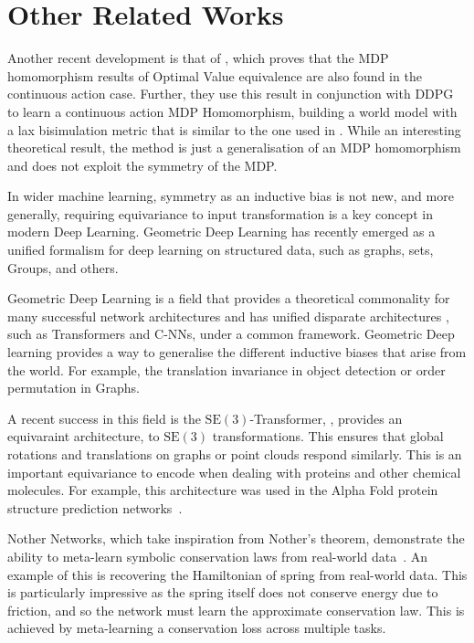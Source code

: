 \section{Other Related Works}

Another recent development is that of \cite{rezaei2022continuous}, which proves that the MDP homomorphism results of Optimal Value equivalence are also found in the continuous action case. Further, they use this result in conjunction with DDPG\cite{lillicrap2015continuous} to learn a continuous action MDP Homomorphism, building a world model with a lax bisimulation metric that is similar to the one used in \cite{van2020plannable}. While an interesting theoretical result, the method is just a generalisation of an MDP homomorphism and does not exploit the symmetry of the MDP.

In wider machine learning, symmetry as an inductive bias is not new, and more generally, requiring equivariance to input transformation is a key concept in modern Deep Learning. Geometric Deep Learning has recently emerged as a unified formalism for deep learning on structured data, such as graphs, sets, Groups, and others.

Geometric Deep Learning is a field that provides a theoretical commonality for many successful network architectures and has unified disparate architectures \cite{bronstein2021geometric}, such as Transformers and C-NNs, under a common framework. Geometric Deep learning provides a way to generalise the different inductive biases that arise from the world. For example, the translation invariance in object detection or order permutation in Graphs.

A recent success in this field is the $\text{SE}(3)$-Transformer, \cite{fuchs2020se}, provides an equivaraint architecture, to $\text{SE}(3)$ transformations. This ensures that global rotations and translations on graphs or point clouds respond similarly. This is an important equivariance to encode when dealing with proteins and other chemical molecules. For example, this architecture was used in the Alpha Fold protein structure prediction networks~\cite{jumper2021highly}.

Nother Networks, which take inspiration from Nother's theorem, demonstrate the ability to meta-learn symbolic conservation laws from real-world data~\cite{alet2021noether}. An example of this is recovering the Hamiltonian of spring from real-world data. This is particularly impressive as the spring itself does not conserve energy due to friction, and so the network must learn the approximate conservation law. This is achieved by meta-learning a conservation loss across multiple tasks.



